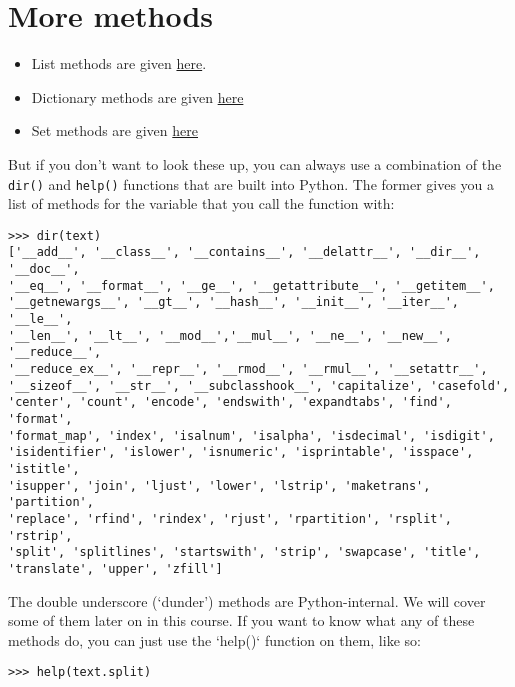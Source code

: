 \documentclass[12pt]{book}
\begin{document}
\section{More methods}

\begin{itemize}
\item List methods are given \href{https://docs.python.org/3.5/tutorial/datastructures.html\#more-on-lists}{here}.
\item Dictionary methods are given \href{https://docs.python.org/3.5/library/stdtypes.html\#typesmapping}{here}
\item Set methods are given \href{https://docs.python.org/3.5/library/stdtypes.html\#set-types-set-frozenset}{here}
\end{itemize}

But if you don't want to look these up, you can always use a combination of the \texttt{dir()} and \texttt{help()} functions that are built into Python. The former gives you a list of methods for the variable that you call the function with:

\begin{lstlisting}
>>> dir(text)
['__add__', '__class__', '__contains__', '__delattr__', '__dir__', '__doc__',
'__eq__', '__format__', '__ge__', '__getattribute__', '__getitem__', 
'__getnewargs__', '__gt__', '__hash__', '__init__', '__iter__', '__le__',
'__len__', '__lt__', '__mod__','__mul__', '__ne__', '__new__', '__reduce__',
'__reduce_ex__', '__repr__', '__rmod__', '__rmul__', '__setattr__', 
'__sizeof__', '__str__', '__subclasshook__', 'capitalize', 'casefold', 
'center', 'count', 'encode', 'endswith', 'expandtabs', 'find', 'format',
'format_map', 'index', 'isalnum', 'isalpha', 'isdecimal', 'isdigit', 
'isidentifier', 'islower', 'isnumeric', 'isprintable', 'isspace', 'istitle', 
'isupper', 'join', 'ljust', 'lower', 'lstrip', 'maketrans', 'partition', 
'replace', 'rfind', 'rindex', 'rjust', 'rpartition', 'rsplit', 'rstrip', 
'split', 'splitlines', 'startswith', 'strip', 'swapcase', 'title', 
'translate', 'upper', 'zfill']
\end{lstlisting}

The double underscore (`dunder') methods are Python-internal. We will cover some of them later on in this course. If you want to know what any of these methods do, you can just use the `help()` function on them, like so:

\begin{lstlisting}
>>> help(text.split)
\end{lstlisting}
\end{document}
